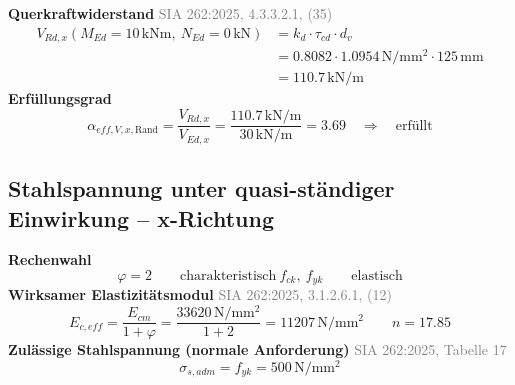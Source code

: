 \documentclass[11pt,a4paper]{article}
\newcommand{\normref}[1]{{\small\textcolor{gray}{#1}}}
\begin{document}
\noindent\textbf{Querkraftwiderstand} \hfill \normref{SIA 262:2025, 4.3.3.2.1, (35)}
\begin{equation*}
\begin{aligned}
  V_{Rd,x}(M_{Ed} = 10\,\mathrm{kNm},\ N_{Ed} = 0\,\mathrm{kN}) &= k_d \cdot \tau_{cd} \cdot d_v \\
  &= 0.8082 \cdot 1.0954\,\mathrm{N}/\mathrm{mm}^{2} \cdot 125\,\mathrm{mm} \\
  &= 110.7\,\mathrm{kN}/\mathrm{m}
\end{aligned}
\end{equation*}
\noindent\textbf{Erfüllungsgrad}
\begin{equation*}
\alpha_{eff,V,x,\text{Rand}} = \frac{V_{Rd,x}}{V_{Ed,x}} = \frac{110.7\,\mathrm{kN}/\mathrm{m}}{30\,\mathrm{kN}/\mathrm{m}} = 3.69 \quad \Rightarrow \quad \text{erfüllt}
\end{equation*}
\subsection{Stahlspannung unter quasi-ständiger Einwirkung – x-Richtung}
\noindent\textbf{Rechenwahl}
\begin{equation*}
\varphi = 2 \qquad \text{charakteristisch}\ f_{ck},\ f_{yk} \qquad \text{elastisch}
\end{equation*}
\noindent\textbf{Wirksamer Elastizitätsmodul} \hfill \normref{SIA 262:2025, 3.1.2.6.1, (12)}
\begin{equation*}
E_{c,eff} = \frac{E_{cm}}{1 + \varphi} = \frac{33620\,\mathrm{N}/\mathrm{mm}^{2}}{1 + 2} = 11207\,\mathrm{N}/\mathrm{mm}^{2} \qquad n = 17.85
\end{equation*}
\noindent\textbf{Zulässige Stahlspannung (normale Anforderung)} \hfill \normref{SIA 262:2025, Tabelle 17}
\begin{equation*}
\sigma_{s,adm} = f_{yk} = 500\,\mathrm{N}/\mathrm{mm}^{2}
\end{equation*}
\end{document}
